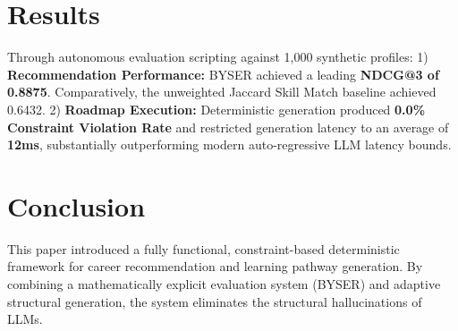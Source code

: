 \documentclass[conference]{IEEEtran}
\begin{document}
\section{Results}
Through autonomous evaluation scripting against 1,000 synthetic profiles:
1) \textbf{Recommendation Performance:} BYSER achieved a leading \textbf{NDCG@3 of 0.8875}. Comparatively, the unweighted Jaccard Skill Match baseline achieved 0.6432.
2) \textbf{Roadmap Execution:} Deterministic generation produced \textbf{0.0\% Constraint Violation Rate} and restricted generation latency to an average of \textbf{12ms}, substantially outperforming modern auto-regressive LLM latency bounds.

\section{Conclusion}
This paper introduced a fully functional, constraint-based deterministic framework for career recommendation and learning pathway generation. By combining a mathematically explicit evaluation system (BYSER) and adaptive structural generation, the system eliminates the structural hallucinations of LLMs. 



\end{document}
